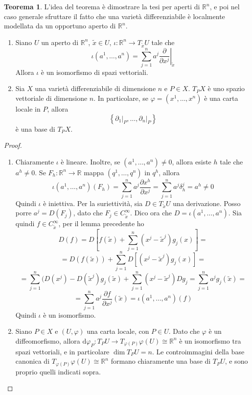 \documentclass[a4paper,11pt]{article}
\theoremstyle{definition}
\theoremstyle{theorem}
\newtheorem{teorema}{Teorema}[section]
\begin{document}
\begin{teorema} L'idea del teorema è dimostrare la tesi per aperti di $\mathbb{R}^n$, e poi nel caso generale sfruttare il fatto che una varietà differenziabile è localmente modellata da un opportuno aperto di $\mathbb{R}^n$.
	\begin{enumerate}
		\item Siano $U$ un aperto di $\mathbb{R}^n$, $\tilde{x}\in U$, $\iota\colon\mathbb{R}^n\to T_{\tilde{x}}U$ tale che \[\iota(a^1,\dots,a^n)=\sum_{j=1}^{n}a^j\left.\frac{\partial}{\partial x^j}\right|_{\tilde{x}}\]
		Allora $\iota$ è un isomorfismo di spazi vettoriali.
		\item Sia $X$ una varietà differenziabile di dimensione $n$ e $P\in X$. $T_PX$ è uno spazio vettoriale di dimensione $n$. In particolare, se $\varphi=(x^1,\dots,x^n)$ è una carta locale in $P$, allora
		\[\left\{\left.\partial_1\right|_{P},\dots,\left.\partial_n\right|_{P}\right\}\]
		è una base di $T_PX$.
	\end{enumerate} 
\end{teorema}
\begin{proof}
	\begin{enumerate}
		\item Chiaramente $\iota$ è lineare. Inoltre, se $(a^1,\dots,a^n)\neq0$, allora esiste $h$ tale che $a^h\neq0$. Se $F_h\colon\mathbb{R}^n\to\mathbb{R}$ mappa $(q^1,\dots,q^n)$ in $q^h$, allora
		\[\iota(a^1,\dots,a^n)(F_h)=\sum_{j=1}^{n}a^j\frac{\partial x^h}{\partial x^j}=\sum_{j=1}^{n}a^j\delta^j_{h}=a^h\neq0\]
		Quindi $\iota$ è iniettiva.
		Per la suriettività, sia $D\in T_{\tilde{x}}U$ una derivazione. Posso porre $a^j=D(F_j)$, dato che $F_j\in C^\infty_{\tilde{x}}$. Dico ora che $D=\iota(a^1,\dots,a^n)$. Sia quindi $f\in C^\infty_{\tilde{x}}$, per il lemma precedente ho
		\[D(f)=D\left[f(\tilde{x})+\sum_{j=1}^{n}(x^j-\tilde{x}^j)g_j(x)\right]=\]
		\[=D(f(\tilde{x}))+\sum_{j=1}^{n}D\left[(x^j-\tilde{x}^j)g_j(x)\right]=\]
		\[=\sum_{j=1}^{n}(D(x^j)-D(\tilde{x}^j)g_j(\tilde{x})+\sum_{j=1}^{n}(x^j-\tilde{x}^j)Dg_j=\sum_{j=1}^{n}a^jg_j(\tilde{x})=\]\[=\sum_{j=1}^{n}a^j\frac{\partial f}{\partial x^j}(\tilde{x})=\iota(a^1,\dots,a^n)(f)\]
		Quindi $\iota$ è un isomorfismo.
		\item Siano $P\in X$ e $(U,\varphi)$ una carta locale, con $P\in U$. Dato che $\varphi$ è un diffeomorfismo, allora $\mathrm{d}\varphi_P\colon T_PU\to T_{\varphi(P)}\varphi(U)\cong\mathbb{R}^n$ è un isomorfismo tra spazi vettoriali, e in particolare $\dim T_PU=n$. Le controimmagini della base canonica di $T_{\varphi(P)}\varphi(U)\cong\mathbb{R}^n$ formano chiaramente una base di $T_PU$, e sono proprio quelli indicati sopra.
	\end{enumerate}
\end{proof}
\end{document}

